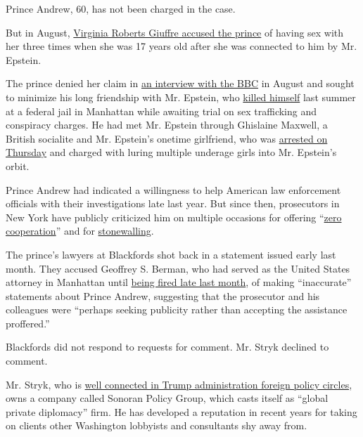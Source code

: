 Prince Andrew, 60, has not been charged in the case.

But in August,
\href{https://www.nytimes.com/2019/12/02/world/europe/prince-andrews-Virginia-Roberts-Giuffre-bbc.html}{Virginia
Roberts Giuffre accused the prince} of having sex with her three times
when she was 17 years old after she was connected to him by Mr. Epstein.

The prince denied her claim in
\href{https://www.nytimes.com/2019/11/17/world/europe/prince-andrew-epstein.html}{an
interview with the BBC} in August and sought to minimize his long
friendship with Mr. Epstein, who
\href{https://www.nytimes.com/2019/08/10/nyregion/jeffrey-epstein-suicide.html}{killed
himself} last summer at a federal jail in Manhattan while awaiting trial
on sex trafficking and conspiracy charges. He had met Mr. Epstein
through Ghislaine Maxwell, a British socialite and Mr. Epstein's onetime
girlfriend, who was
\href{https://www.nytimes.com/2020/07/02/nyregion/ghislaine-maxwell-arrest-jeffrey-epstein.html}{arrested
on Thursday} and charged with luring multiple underage girls into Mr.
Epstein's orbit.

Prince Andrew had indicated a willingness to help American law
enforcement officials with their investigations late last year. But
since then, prosecutors in New York have publicly criticized him on
multiple occasions for offering
``\href{https://www.nytimes.com/2020/01/27/nyregion/jeffrey-epstein-prince-andrew.html}{zero
cooperation}'' and for
\href{https://www.nytimes.com/2020/03/09/nyregion/jeffrey-epstein-prince-andrew.html}{stonewalling}.

The prince's lawyers at Blackfords shot back in a statement issued early
last month. They accused Geoffrey S. Berman, who had served as the
United States attorney in Manhattan until
\href{https://www.nytimes.com/2020/06/20/nyregion/trump-geoffrey-berman-fired-sdny.html}{being
fired late last month}, of making ``inaccurate'' statements about Prince
Andrew, suggesting that the prosecutor and his colleagues were ``perhaps
seeking publicity rather than accepting the assistance proffered.''

Blackfords did not respond to requests for comment. Mr. Stryk declined
to comment.

Mr. Stryk, who is
\href{https://www.nytimes.com/2017/08/30/magazine/how-to-get-rich-in-trumps-washington.html}{well
connected in Trump administration foreign policy circles}, owns a
company called Sonoran Policy Group, which casts itself as ``global
private diplomacy'' firm. He has developed a reputation in recent years
for taking on clients other Washington lobbyists and consultants shy
away from.

